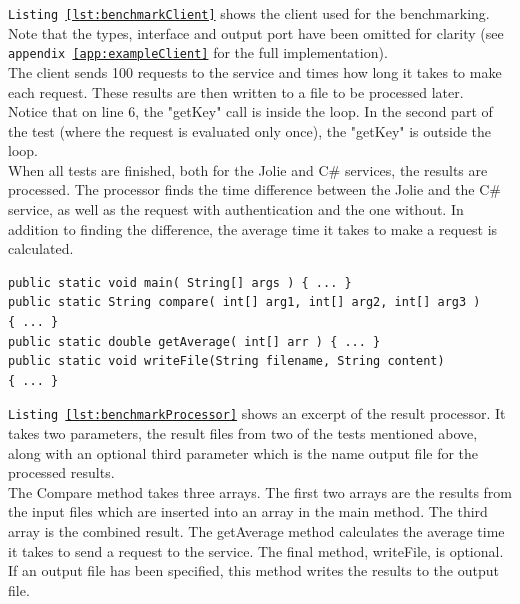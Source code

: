 \documentclass[12pt,a4paper]{article}
\begin{document}
\texttt{Listing \ref{lst:benchmarkClient}} shows the client used for the benchmarking. Note that the types, interface and output port have been omitted for clarity (see \texttt{appendix \ref{app:exampleClient}} for the full implementation).\\
The client sends 100 requests to the service and times how long it takes to make each request. These results are then written to a file to be processed later. \\
Notice that on line 6, the "getKey" call is inside the loop. In the second part of the test (where the request is evaluated only once), the "getKey" is outside the loop.\\

When all tests are finished, both for the Jolie and C\# services, the results are processed. The processor finds the time difference between the Jolie and the C\# service, as well as the request with authentication and the one without. In addition to finding the difference, the average time it takes to make a request is calculated.\\

\begin{lstlisting}[caption={Result processor excerpt},label={lst:benchmarkProcessor}]
public static void main( String[] args ) { ... }
public static String compare( int[] arg1, int[] arg2, int[] arg3 )
{ ... }
public static double getAverage( int[] arr ) { ... }
public static void writeFile(String filename, String content)
{ ... }
\end{lstlisting}

\texttt{Listing \ref{lst:benchmarkProcessor}} shows an excerpt of the result processor. It takes two parameters, the result files from two of the tests mentioned above, along with an optional third parameter which is the name output file for the processed results.\\
The Compare method takes three arrays. The first two arrays are the results from the input files which are inserted into an array in the main method. The third array is the combined result. The getAverage method calculates the average time it takes to send a request to the service. The final method, writeFile, is optional. If an output file has been specified, this method writes the results to the output file.\\
\end{document}
